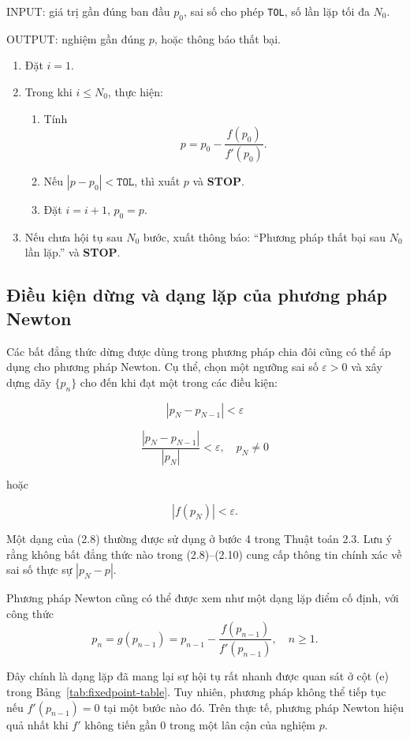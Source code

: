 INPUT: giá trị gần đúng ban đầu $p_0$, sai số cho phép \texttt{TOL}, số lần lặp tối đa $N_0$.  

OUTPUT: nghiệm gần đúng $p$, hoặc thông báo thất bại.

\begin{enumerate}
  \item Đặt $i = 1$.
  \item Trong khi $i \leq N_0$, thực hiện:
  \begin{enumerate}
    \item Tính
    \[
    p = p_0 - \frac{f(p_0)}{f'(p_0)}.
    \]
    \item Nếu $|p - p_0| < \texttt{TOL}$, thì xuất $p$ và \textbf{STOP}.
    \item Đặt $i = i+1$, $p_0 = p$.
  \end{enumerate}
  \item Nếu chưa hội tụ sau $N_0$ bước, xuất thông báo: ``Phương pháp thất bại sau $N_0$ lần lặp.'' và \textbf{STOP}.
\end{enumerate}

\subsection*{Điều kiện dừng và dạng lặp của phương pháp Newton}

Các bất đẳng thức dừng được dùng trong phương pháp chia đôi cũng có thể áp dụng cho phương pháp Newton. 
Cụ thể, chọn một ngưỡng sai số $\varepsilon > 0$ và xây dựng dãy $\{p_n\}$ cho đến khi đạt một trong các điều kiện:

\[
|p_N - p_{N-1}| < \varepsilon \tag{2.8}
\]

\[
\frac{|p_N - p_{N-1}|}{|p_N|} < \varepsilon, 
\quad p_N \neq 0 \tag{2.9}
\]

hoặc

\[
|f(p_N)| < \varepsilon. \tag{2.10}
\]

Một dạng của (2.8) thường được sử dụng ở bước 4 trong Thuật toán 2.3. 
Lưu ý rằng không bất đẳng thức nào trong (2.8)--(2.10) cung cấp thông tin chính xác về sai số thực sự $|p_N - p|$.

Phương pháp Newton cũng có thể được xem như một dạng lặp điểm cố định, với công thức
\[
p_n = g(p_{n-1}) = p_{n-1} - \frac{f(p_{n-1})}{f'(p_{n-1})}, \quad n \geq 1. \tag{2.11}
\]

Đây chính là dạng lặp đã mang lại sự hội tụ rất nhanh được quan sát ở cột (e) trong Bảng~\ref{tab:fixedpoint-table}. 
Tuy nhiên, phương pháp không thể tiếp tục nếu $f'(p_{n-1}) = 0$ tại một bước nào đó. 
Trên thực tế, phương pháp Newton hiệu quả nhất khi $f'$ không tiến gần 0 trong một lân cận của nghiệm $p$.

